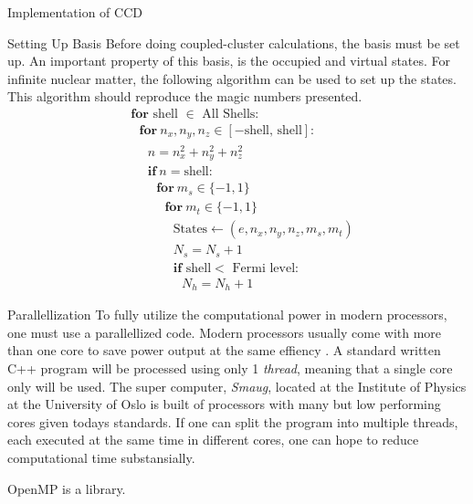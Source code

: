 \documentclass[twoside,english]{uiofysmaster}
\begin{document}
\begin{chapter}{Implementation of CCD}
	\begin{section}{Setting Up Basis}
		Before doing coupled-cluster calculations, the basis must be set up. An important property of this basis, is the occupied and virtual states. For infinite nuclear matter, the following algorithm can be used to set up the states. This algorithm should reproduce the magic numbers presented. 
		\begin{align*}
			&\mathbf{for } \text{ shell } \in \text{ All Shells}: \\
			&\:\:\:\mathbf{for } \: n_x, n_y, n_z \in [-\text{shell, shell} ]: \\
			&\:\:\:\:\:\:n = n_x^2 + n_y^2 + n_z^2 \\
			&\:\:\:\:\:\:\mathbf{if }\: n = \text{shell}: \\
			&\:\:\:\:\:\:\:\:\:\mathbf{for } \: m_s \in \{-1,1\} \\
			&\:\:\:\:\:\:\:\:\:\:\:\: \mathbf{for } \: m_t \in \{-1,1\} \\
			&\:\:\:\:\:\:\:\:\:\:\:\:\:\:\:\text{States} \leftarrow (e, n_x, n_y, n_z, m_s, m_t) \\
			&\:\:\:\:\:\:\:\:\:\:\:\:\:\:\:N_s = N_s + 1 \\
			&\:\:\:\:\:\:\:\:\:\:\:\:\:\:\:\mathbf{if } \text{ shell} < \text{ Fermi level}: \\
			&\:\:\:\:\:\:\:\:\:\:\:\:\:\:\:\:\:\: N_h = N_h + 1
		\end{align*}
	\end{section}

	\begin{section}{Parallellization}
		To fully utilize the computational power in modern processors, one must use a parallellized code. Modern processors usually come with more than one core to save power output at the same effiency \cite{IntelOpenMP}. A standard written C++ program will be processed using only 1 \textit{thread}, meaning that a single core only will be used. The super computer, \textit{Smaug}, located at the Institute of Physics at the University of Oslo is built of processors with many but low performing cores given todays standards. If one can split the program into multiple threads, each executed at the same time in different cores, one can hope to reduce computational time substansially. 
		
		OpenMP is a library. 
	\end{section}

\end{chapter}
\end{document}
